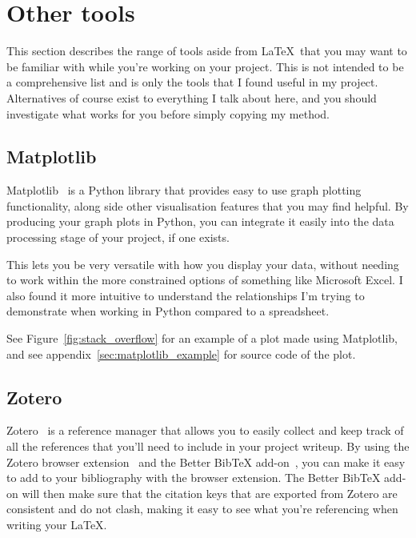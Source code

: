 \section{Other tools}
\label{sec:other_tools}

This section describes the range of tools aside from \LaTeX\ that you may want to be familiar with
while you're working on your project. This is not intended to be a comprehensive list and is only
the tools that I found useful in my project. Alternatives of course exist to everything I talk
about here, and you should investigate what works for you before simply copying my method.

\subsection{Matplotlib}

Matplotlib~\cite{MatplotlibVisualizationPython} is a Python library that provides easy to use
graph plotting functionality, along side other visualisation features that you may find helpful.
By producing your graph plots in Python, you can integrate it easily into the data processing
stage of your project, if one exists.

This lets you be very versatile with how you display your data, without needing to work within the
more constrained options of something like Microsoft Excel. I also found it more intuitive to
understand the relationships I'm trying to demonstrate when working in Python compared to a
spreadsheet.

See Figure~\ref{fig:stack_overflow} for an example of a plot made using Matplotlib, and see
appendix~\ref{sec:matplotlib_example} for source code of the plot.

\subsection{Zotero}

Zotero~\cite{ZoteroYourPersonal} is a reference manager that allows you to easily collect and keep
track of all the references that you'll need to include in your project writeup. By using the
Zotero browser extension~\cite{ZoteroConnectors} and the Better BibTeX
add-on~\cite{BetterBibTeXZotero}, you can make it easy to add to your bibliography with the
browser extension. The Better BibTeX add-on will then make sure that the citation keys that are
exported from Zotero are consistent and do not clash, making it easy to see what you're
referencing when writing your \LaTeX.

